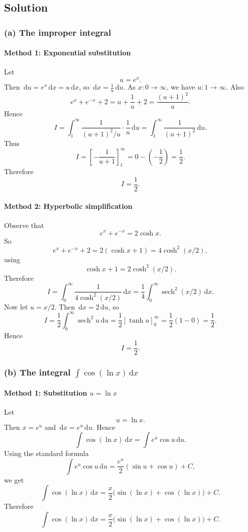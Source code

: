 \documentclass[12pt]{article}
\newcommand{\dd}{\,\mathrm{d}}
\DeclareMathOperator{\sech}{sech}
\begin{document}
\subsection{Solution}

\subsubsection{(a) The improper integral}

\paragraph{Method 1: Exponential substitution}
Let
\[
u=e^x.
\]
Then \(\dd u=e^x\dd x=u\dd x\), so \(\dd x=\frac{1}{u}\dd u\). As \(x:0\to\infty\), we have \(u:1\to\infty\). Also
\[
e^x+e^{-x}+2=u+\frac{1}{u}+2=\frac{(u+1)^2}{u}.
\]
Hence
\[
I
=
\int_1^\infty \frac{1}{(u+1)^2/u}\cdot \frac{1}{u}\dd u
=
\int_1^\infty \frac{1}{(u+1)^2}\dd u.
\]
Thus
\[
I=\left[-\frac{1}{u+1}\right]_1^\infty
=0-\left(-\frac12\right)=\frac12.
\]
Therefore
\[
\boxed{I=\frac12.}
\]

\paragraph{Method 2: Hyperbolic simplification}
Observe that
\[
e^x+e^{-x}=2\cosh x.
\]
So
\[
e^x+e^{-x}+2=2(\cosh x+1)=4\cosh^2(x/2),
\]
using
\[
\cosh x+1=2\cosh^2(x/2).
\]
Therefore
\[
I=\int_0^\infty \frac{1}{4\cosh^2(x/2)}\dd x
=
\frac14\int_0^\infty \sech^2(x/2)\dd x.
\]
Now let \(u=x/2\). Then \(\dd x=2\dd u\), so
\[
I=\frac12\int_0^\infty \sech^2 u \dd u
=
\frac12\left[\tanh u\right]_0^\infty
=
\frac12(1-0)
=
\frac12.
\]
Hence
\[
\boxed{I=\frac12.}
\]

\bigskip

\subsubsection{(b) The integral \(\int \cos(\ln x)\dd x\)}

\paragraph{Method 1: Substitution \(u=\ln x\)}
Let
\[
u=\ln x.
\]
Then \(x=e^u\) and \(\dd x=e^u\dd u\). Hence
\[
\int \cos(\ln x)\dd x
=
\int e^u\cos u \dd u.
\]
Using the standard formula
\[
\int e^u\cos u\dd u=\frac{e^u}{2}(\sin u+\cos u)+C,
\]
we get
\[
\int \cos(\ln x)\dd x
=
\frac{x}{2}\bigl(\sin(\ln x)+\cos(\ln x)\bigr)+C.
\]
Therefore
\[
\boxed{\int \cos(\ln x)\dd x=\frac{x}{2}\bigl(\sin(\ln x)+\cos(\ln x)\bigr)+C.}
\]
\end{document}
